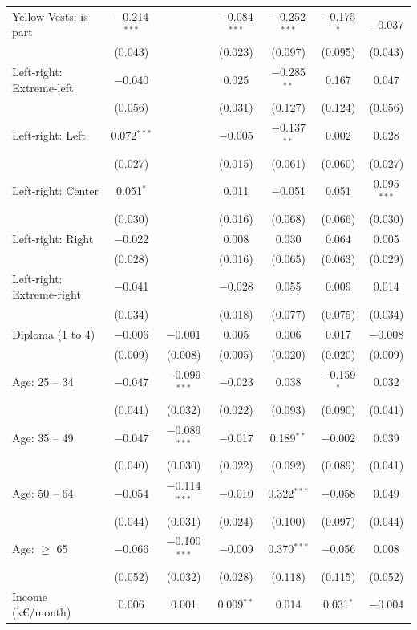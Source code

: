 \documentclass[english,5p,authoryear]{elsarticle}
\begin{document}
\begin{table}[!htbp]
{\begin{tabular}{@{\extracolsep{5pt}}lcccccc}
  Yellow Vests: is part & $-$0.214$^{***}$ &  & $-$0.084$^{***}$ & $-$0.252$^{***}$ & $-$0.175$^{*}$ & $-$0.037 \\ 
  & (0.043) &  & (0.023) & (0.097) & (0.095) & (0.043) \\ 
  Left-right: Extreme-left & $-$0.040 &  & 0.025 & $-$0.285$^{**}$ & 0.167 & 0.047 \\ 
  & (0.056) &  & (0.031) & (0.127) & (0.124) & (0.056) \\ 
  Left-right: Left & 0.072$^{***}$ &  & $-$0.005 & $-$0.137$^{**}$ & 0.002 & 0.028 \\ 
  & (0.027) &  & (0.015) & (0.061) & (0.060) & (0.027) \\ 
  Left-right: Center & 0.051$^{*}$ &  & 0.011 & $-$0.051 & 0.051 & 0.095$^{***}$ \\ 
  & (0.030) &  & (0.016) & (0.068) & (0.066) & (0.030) \\ 
  Left-right: Right & $-$0.022 &  & 0.008 & 0.030 & 0.064 & 0.005 \\ 
  & (0.028) &  & (0.016) & (0.065) & (0.063) & (0.029) \\ 
  Left-right: Extreme-right & $-$0.041 &  & $-$0.028 & 0.055 & 0.009 & 0.014 \\ 
  & (0.034) &  & (0.018) & (0.077) & (0.075) & (0.034) \\ 
  Diploma (1 to 4) & $-$0.006 & $-$0.001 & 0.005 & 0.006 & 0.017 & $-$0.008 \\ 
  & (0.009) & (0.008) & (0.005) & (0.020) & (0.020) & (0.009) \\ 
  Age: 25 -- 34 & $-$0.047 & $-$0.099$^{***}$ & $-$0.023 & 0.038 & $-$0.159$^{*}$ & 0.032 \\ 
  & (0.041) & (0.032) & (0.022) & (0.093) & (0.090) & (0.041) \\ 
  Age: 35 -- 49 & $-$0.047 & $-$0.089$^{***}$ & $-$0.017 & 0.189$^{**}$ & $-$0.002 & 0.039 \\ 
  & (0.040) & (0.030) & (0.022) & (0.092) & (0.089) & (0.041) \\ 
  Age: 50 -- 64 & $-$0.054 & $-$0.114$^{***}$ & $-$0.010 & 0.322$^{***}$ & $-$0.058 & 0.049 \\ 
  & (0.044) & (0.031) & (0.024) & (0.100) & (0.097) & (0.044) \\ 
  Age: $\geq$ 65 & $-$0.066 & $-$0.100$^{***}$ & $-$0.009 & 0.370$^{***}$ & $-$0.056 & 0.008 \\ 
  & (0.052) & (0.032) & (0.028) & (0.118) & (0.115) & (0.052) \\ 
  Income (k\euro{}/month) & 0.006 & 0.001 & 0.009$^{**}$ & 0.014 & 0.031$^{*}$ & $-$0.004 \\ 

\end{tabular}}
\end{table}
\end{document}
